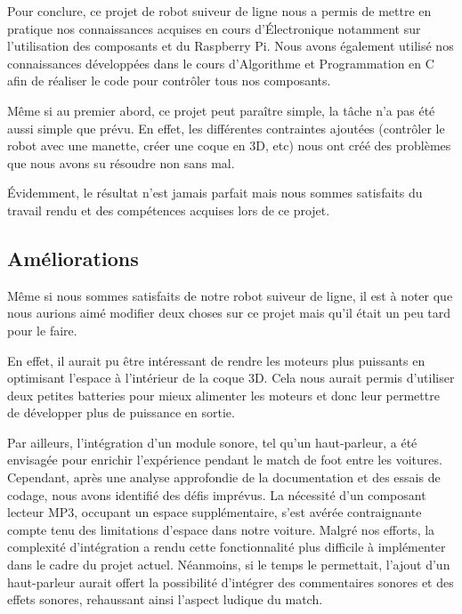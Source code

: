 Pour conclure, ce projet de robot suiveur de ligne nous a permis de mettre en pratique nos connaissances acquises en cours d'Électronique notamment sur l'utilisation des composants et du Raspberry Pi. Nous avons également utilisé nos connaissances développées dans le cours d'Algorithme et Programmation en C afin de réaliser le code pour contrôler tous nos composants.

Même si au premier abord, ce projet peut paraître simple, la tâche n'a pas été aussi simple que prévu. En effet, les différentes contraintes ajoutées (contrôler le robot avec une manette, créer une coque en 3D, etc) nous ont créé des problèmes que nous avons su résoudre non sans mal.

Évidemment, le résultat n'est jamais parfait mais nous sommes satisfaits du travail rendu et des compétences acquises lors de ce projet.

\subsection{Améliorations}
Même si nous sommes satisfaits de notre robot suiveur de ligne, il est à noter que nous aurions aimé modifier deux choses sur ce projet mais qu'il était un peu tard pour le faire.

En effet, il aurait pu être intéressant de rendre les moteurs plus puissants en optimisant l'espace à l'intérieur de la coque 3D. Cela nous aurait permis d'utiliser deux petites batteries pour mieux alimenter les moteurs et donc leur permettre de développer plus de puissance en sortie.

Par ailleurs, l'intégration d'un module sonore, tel qu'un haut-parleur, a été envisagée pour enrichir l'expérience pendant le match de foot entre les voitures. Cependant, après une analyse approfondie de la documentation et des essais de codage, nous avons identifié des défis imprévus. La nécessité d'un composant lecteur MP3, occupant un espace supplémentaire, s'est avérée contraignante compte tenu des limitations d'espace dans notre voiture. Malgré nos efforts, la complexité d'intégration a rendu cette fonctionnalité plus difficile à implémenter dans le cadre du projet actuel. Néanmoins, si le temps le permettait, l'ajout d'un haut-parleur aurait offert la possibilité d'intégrer des commentaires sonores et des effets sonores, rehaussant ainsi l'aspect ludique du match.
\newpage